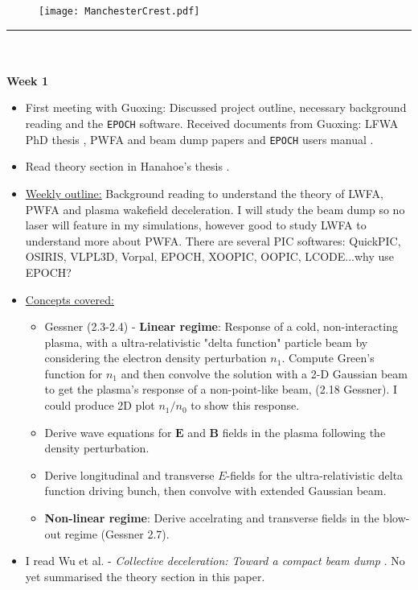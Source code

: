 \documentclass[%
onecolumn, notitlepage,
 amsmath,amssymb,
 aps,
]{article}
\renewcommand{\vec}[1]{\mathbf{#1}}
\begin{document}
\begin{figure}[h]
\vspace{-95pt}\hspace{0.85\textwidth}
\texttt{[image: ManchesterCrest.pdf]} 
\end{figure}\vspace{-35pt}
\noindent\rule{0.72\textwidth}{0.4pt}\\
\\
\noindent \textbf{Week 1}
\begin{itemize}
\item[\textcolor{MancPurple}{\textbullet}]  First meeting with Guoxing: Discussed project outline, necessary background reading and the \texttt{EPOCH} software. Received documents from Guoxing: LFWA PhD thesis \citep{Chou2016}, PWFA and beam dump papers \citep{Bonatto2015,Bonatto2016,Lu2005,Wu2010,Chou2016a,Hanahoe2017} and  \texttt{EPOCH} users manual \citep{Bennett2015}.
\item[\textcolor{MancPurple}{\textbullet}] Read theory section in Hanahoe's thesis \citep{Hanahoe2017}.
\item[\textcolor{MancPurple}{\textbullet}] \underline{Weekly outline:} Background reading to understand the theory of LWFA, PWFA and plasma wakefield deceleration. I will study the beam dump so no laser will feature in my simulations, however good to study LWFA to understand more about PWFA. There are several PIC softwares: QuickPIC, OSIRIS, VLPL3D, Vorpal, EPOCH, XOOPIC, OOPIC, LCODE...why use EPOCH?
\item[\textcolor{MancPurple}{\textbullet}] \underline{Concepts covered:}
 \begin{itemize}
\item[\textcolor{MancPurple}{\textopenbullet}] Gessner (2.3-2.4) - \textbf{Linear regime}: Response of a cold, non-interacting plasma, with a ultra-relativistic "delta function" particle beam by considering the electron density perturbation $n_1$. Compute Green's function for $n_1$ and then convolve the solution with a 2-D Gaussian beam to get the plasma's response of a non-point-like beam, (2.18 Gessner). I could produce 2D plot $n_1/n_0$ to show this response.
\item[\textcolor{MancPurple}{\textopenbullet}] Derive wave equations for $\vec{E}$ and $\vec{B}$ fields in the plasma following the density perturbation.
\item[\textcolor{MancPurple}{\textopenbullet}] Derive longitudinal and transverse $E$-fields for the ultra-relativistic delta function driving bunch, then convolve with extended Gaussian beam.
\item[\textcolor{MancPurple}{\textopenbullet}] \textbf{Non-linear regime}: Derive accelrating and transverse fields in the blow-out regime (Gessner 2.7).
\end{itemize}
\item[\textcolor{MancPurple}{\textbullet}] I read Wu et al.  - \textit{Collective deceleration: Toward a compact beam dump}\citep{Wu2010} . No yet summarised the theory section in this paper.



\end{itemize}
\end{document}
